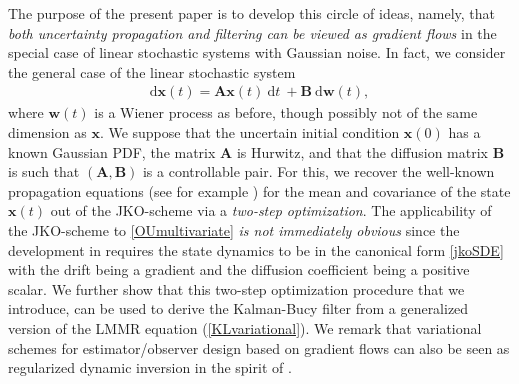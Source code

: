 \documentclass[letterpaper,10pt,twocolumn,conference]{ieeeconf}
\newcommand{\bbx}{{\bm{x}}}
\newcommand{\blue}{\textcolor{blue}}
\begin{document}
The purpose of the present paper is to develop this circle of ideas, namely, that {\em both uncertainty propagation and filtering can be viewed as gradient flows} in the special case of linear stochastic systems with Gaussian noise. In fact, we consider the general case of
the linear stochastic system
\begin{eqnarray}
\mathrm{d}\bm{x}(t) = \bm{A}\bm{x}(t) \: \mathrm{d}t\: + \bm{B}\:\mathrm{d}\bm{w}(t),
\label{OUmultivariate}
\end{eqnarray}
where $\bm{w}(t)$ is a Wiener process as before, though possibly not of the same dimension as $\bbx$. We suppose that the uncertain initial condition $\bm{x}(0)$ has a known Gaussian PDF, the matrix $\bm{A}$ is Hurwitz, and that the diffusion matrix $\bm{B}$ is such that $(\bm{A},\bm{B})$ is a controllable pair. For this, we recover the well-known propagation equations (see for example \cite[Ch. 3.6]{AstromBook1970}) for the mean and covariance of the state $\bbx(t)$ out of the JKO-scheme via a \emph{two-step optimization}. The applicability of the JKO-scheme to \eqref{OUmultivariate} {\em is not immediately obvious} since the development in \cite{JKO1998} requires the state dynamics to be in the canonical form \eqref{jkoSDE} with the drift being a gradient and the diffusion coefficient being a positive scalar. We further show that this two-step optimization procedure that we introduce, can be used to derive the Kalman-Bucy filter from a generalized version of the LMMR equation (\ref{KLvariational}). We remark that variational schemes for estimator/observer design based on gradient flows can also be seen as regularized dynamic inversion in the spirit of \cite{YezziVerriest2007}.

\end{document}
